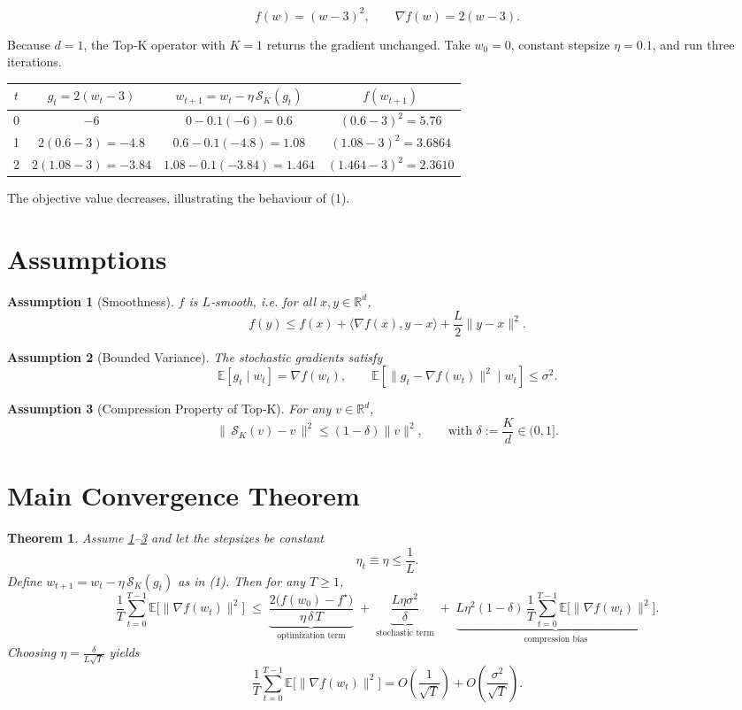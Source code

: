 \documentclass{article}
\newtheorem{theorem}{Theorem}
\newtheorem{assumption}{Assumption}
\newcommand{\E}{\mathbb{E}}
\newcommand{\R}{\mathbb{R}}
\newcommand{\cK}{\mathcal{S}_K}
\begin{document}
\[
f(w)=(w-3)^2,\qquad \nabla f(w)=2(w-3).
\]

Because $d=1$, the Top‑K operator with $K=1$ returns the gradient unchanged.  
Take $w_0=0$, constant stepsize $\eta=0.1$, and run three iterations.

\begin{center}
\begin{tabular}{c|c|c|c}
$t$ & $g_t=2(w_t-3)$ & $w_{t+1}=w_t-\eta\,\cK(g_t)$ & $f(w_{t+1})$\\\hline
0 & $-6$ & $0-0.1(-6)=0.6$ & $(0.6-3)^2=5.76$\\
1 & $2(0.6-3)=-4.8$ & $0.6-0.1(-4.8)=1.08$ & $(1.08-3)^2=3.6864$\\
2 & $2(1.08-3)=-3.84$ & $1.08-0.1(-3.84)=1.464$ & $(1.464-3)^2=2.3610$
\end{tabular}
\end{center}
The objective value decreases, illustrating the behaviour of (1).

\newpage
\section*{Assumptions}
\begin{assumption}[Smoothness]\label{ass:smooth}
$f$ is $L$‑smooth, i.e. for all $x,y\in\R^{d}$,
\[
f(y)\le f(x)+\langle\nabla f(x),y-x\rangle+\frac{L}{2}\|y-x\|^{2}.
\]
\end{assumption}

\begin{assumption}[Bounded Variance]\label{ass:var}
The stochastic gradients satisfy
\[
\E[g_t\mid w_t]=\nabla f(w_t),\qquad 
\E\!\left[\|g_t-\nabla f(w_t)\|^{2}\mid w_t\right]\le\sigma^{2}.
\]
\end{assumption}

\begin{assumption}[Compression Property of Top‑K]\label{ass:comp}
For any $v\in\R^{d}$,
\[
\|\,\cK(v)-v\,\|^{2}\le (1-\delta)\|v\|^{2},
\qquad\text{with }\delta:=\frac{K}{d}\in(0,1].
\tag{2}
\]
\end{assumption}

\section*{Main Convergence Theorem}
\begin{theorem}\label{thm:main}
Assume \ref{ass:smooth}–\ref{ass:comp} and let the stepsizes be constant
\[
\eta_t\equiv\eta\le\frac{1}{L}.
\]
Define $w_{t+1}=w_t-\eta\,\cK(g_t)$ as in (1). Then for any $T\ge1$,
\[
\frac{1}{T}\sum_{t=0}^{T-1}\E\!\big[\|\nabla f(w_t)\|^{2}\big]
\;\le\;
\underbrace{\frac{2\big(f(w_0)-f^{\star}\big)}{\eta\,\delta\,T}}_{\text{optimization term}}
\;+\;
\underbrace{ \frac{L\eta\sigma^{2}}{\delta}}_{\text{stochastic term}}
\;+\;
\underbrace{L\eta^{2}(1-\delta)\,\frac{1}{T}\sum_{t=0}^{T-1}\E\!\big[\|\nabla f(w_t)\|^{2}\big]}_{\text{compression bias}}.
\]
Choosing $\eta=\frac{\delta}{L\sqrt{T}}$ yields  
\[
\frac{1}{T}\sum_{t=0}^{T-1}\E\!\big[\|\nabla f(w_t)\|^{2}\big]
=O\!\left(\frac{1}{\sqrt{T}}\right)+O\!\left(\frac{\sigma^{2}}{\sqrt{T}}\right).
\]
\end{theorem}
\end{document}
